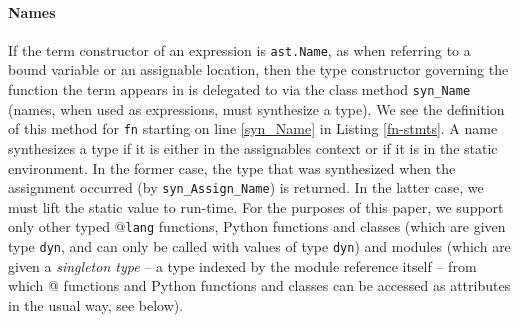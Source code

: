 \documentclass[9pt,preprint]{sigplanconf}
\newcommand{\lstinlinep}[1]{\lstinline[language=Python,basicstyle=\ttfamily\small]{#1}}
\begin{document}
\paragraph{Names} If the term constructor of an expression is \lstinlinep{ast.Name}, as when referring to a bound variable or an assignable location, then the type constructor governing the function the term appears in is delegated to via the class method \lstinlinep{syn_Name} (names, when used as expressions, must synthesize a type). We see the definition of this method for \lstinlinep{fn} starting on line \ref{syn_Name} in Listing \ref{fn-stmts}. A name synthesizes a type if it is either in the assignables context or if it is in the static environment. In the former case, the type that was synthesized when the assignment occurred (by \lstinlinep{syn_Assign_Name}) is returned. In the latter case, we must lift the static value to run-time. For the purposes of this paper, we support only other typed @\texttt{lang} functions, Python functions and classes (which are given type \lstinlinep{dyn}, and can only be called with values of type \lstinlinep{dyn}) and modules (which are given a \emph{singleton type} -- a type indexed by the module reference itself -- from which @ functions and Python functions and classes can be accessed as attributes in the usual way, see below).%
\end{document}
